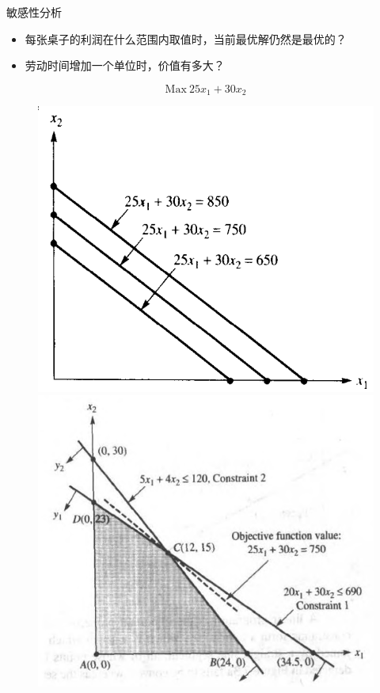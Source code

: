 \documentclass[UTF8]{ctexbeamer}
\begin{document}
\begin{frame}{敏感性分析}
  \begin{itemize}
  \item 每张桌子的利润在什么范围内取值时，当前最优解仍然是最优的？
  \item 劳动时间增加一个单位时，价值有多大？
  \end{itemize}
  \[
  \mbox{Max}\ 25x_1 + 30x_2
  \]

  \begin{figure}
    \begin{minipage}{.5\linewidth}
      \includegraphics[width=\textwidth{}]{level.png}
    \end{minipage}%
    \begin{minipage}{.5\linewidth}
      \includegraphics[width=\textwidth{}]{wood.png}
    \end{minipage}
  \end{figure}  

\end{frame}
\end{document}
